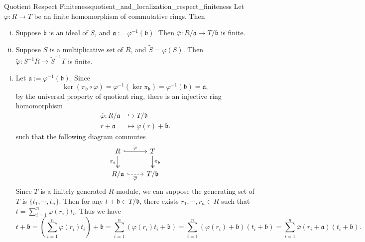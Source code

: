 \begin{proposition}{Quotient Respect Finiteness}{quotient_and_localization_respect_finiteness}
    Let $\varphi:R\to T$ be an finite homomorphism of commutative rings. Then 
    \begin{enumerate}[(i)]
        \item Suppose $\mathfrak{b}$ is an ideal of $S$, and $\mathfrak{a}:=\varphi^{-1}(\mathfrak{b})$. Then $\overline{\varphi}:R/\mathfrak{a}\to T/\mathfrak{b}$ is finite.
        \item Suppose $S$ is a multiplicative set of $R$, and $\widetilde{S}=\varphi(S)$. Then $\widetilde{\varphi}:S^{-1}R\to \widetilde{S}^{-1}T$ is finite.
    \end{enumerate}
\end{proposition}
\begin{prf}
    \begin{enumerate}[(i)]
        \item Let $\mathfrak{a}:=\varphi^{-1}(\mathfrak{b})$. Since 
    \[
    \ker (\pi_{\mathfrak{b}}\circ \varphi )= \varphi^{-1}\left(\ker \pi_{\mathfrak{b}}\right)=\varphi^{-1}\left(\mathfrak{b}\right)=\mathfrak{a},
    \]
    by the universal property of quotient ring, there is an injective ring homomorphism 
    \begin{align*}
        \overline{\varphi}:R/\mathfrak{a}&\hookrightarrow T/\mathfrak{b}\\
        r+\mathfrak{a}&\longmapsto \varphi(r)+\mathfrak{b}.
    \end{align*}
     such that the following diagram commutes
    \[
        \begin{tikzcd}
            R \arrow[r, "\varphi", hook] \arrow[d, "\pi_{\mathfrak{a}}"', two heads] & T \arrow[d, "\pi_{\mathfrak{b}}", two heads] \\
            R/\mathfrak{a} \arrow[r, "\overline{\varphi}"', dashed, hook]                & T/\mathfrak{b}             
        \end{tikzcd}
    \]
    Since $T$ is a finitely generated $R$-module, we can suppose the generating set of $T$ is $\{t_1,\cdots,t_n\}$. Then for any $t+\mathfrak{b}\in T/\mathfrak{b}$, there exists $r_1,\cdots,r_n\in R$ such that $t=\sum_{i=1}^n \varphi(r_i)t_i$. Thus we have
    \[
    t+\mathfrak{b}=\left(\sum_{i=1}^n \varphi(r_i)t_i\right)+\mathfrak{b}
    =\sum_{i=1}^n \left(\varphi(r_i)t_i+\mathfrak{b}\right)=\sum_{i=1}^n (\varphi(r_i)+\mathfrak{b})\left(t_i+\mathfrak{b}\right)=\sum_{i=1}^n \overline{\varphi}(r_i+\mathfrak{a})\left(t_i+\mathfrak{b}\right).
\]
\end{enumerate}
\end{prf}
